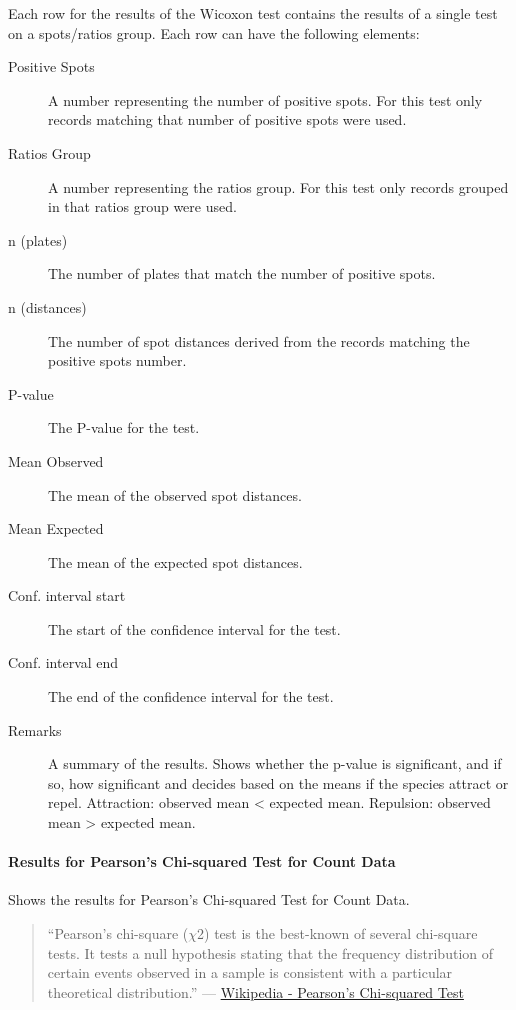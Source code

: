 \documentclass[letterpaper,10pt,english]{sphinxmanual}
\begin{document}
Each row for the results of the Wicoxon test contains the results
of a single test on a spots/ratios group. Each row can have the
following elements:
\begin{description}
\item[{Positive Spots}] \leavevmode
A number representing the number of positive spots. For this test
only records matching that number of positive spots were used.

\item[{Ratios Group}] \leavevmode
A number representing the ratios group. For this test
only records grouped in that ratios group were used.

\item[{n (plates)}] \leavevmode
The number of plates that match the number of positive spots.

\item[{n (distances)}] \leavevmode
The number of spot distances derived from the records matching the
positive spots number.

\item[{P-value}] \leavevmode
The P-value for the test.

\item[{Mean Observed}] \leavevmode
The mean of the observed spot distances.

\item[{Mean Expected}] \leavevmode
The mean of the expected spot distances.

\item[{Conf. interval start}] \leavevmode
The start of the confidence interval for the test.

\item[{Conf. interval end}] \leavevmode
The end of the confidence interval for the test.

\item[{Remarks}] \leavevmode
A summary of the results. Shows whether the p-value is significant,
and if so, how significant and decides based on the means if the
species attract or repel.
Attraction: observed mean \textless{} expected mean.
Repulsion: observed mean \textgreater{} expected mean.

\end{description}


\paragraph{Results for Pearson's Chi-squared Test for Count Data}
\label{user_manual:results-for-pearson-s-chi-squared-test-for-count-data}
Shows the results for Pearson's Chi-squared Test for Count Data.
\begin{quote}

``Pearson's chi-square (\(\chi\)2) test is the
best-known of several chi-square tests. It tests a null hypothesis
stating that the frequency distribution of certain events observed
in a sample is consistent with a particular theoretical distribution.''
--- \href{http://en.wikipedia.org/wiki/Pearson's\_chi-square\_test}{Wikipedia - Pearson's Chi-squared Test}
\end{quote}
\end{document}
